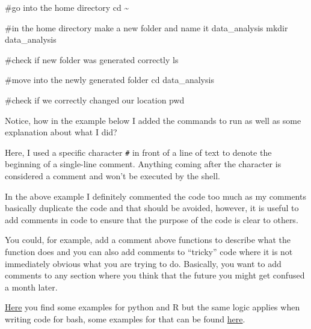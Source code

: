 \documentclass[
  letterpaper,
  DIV=11,
  numbers=noendperiod]{scrreprt}
\newenvironment{Shaded}{}{}
\newcommand{\BuiltInTok}[1]{\textcolor[rgb]{0.84,0.23,0.29}{#1}}
\newcommand{\CommentTok}[1]{\textcolor[rgb]{0.42,0.45,0.49}{#1}}
\newcommand{\FunctionTok}[1]{\textcolor[rgb]{0.44,0.26,0.76}{#1}}
\newcommand{\NormalTok}[1]{\textcolor[rgb]{0.14,0.16,0.18}{#1}}
\begin{document}
\begin{Shaded}
\begin{Highlighting}[]
\CommentTok{\#go into the home directory}
\BuiltInTok{cd}\NormalTok{ \textasciitilde{}}

\CommentTok{\#in the home directory make a new folder and name it data\_analysis}
\FunctionTok{mkdir}\NormalTok{ data\_analysis}

\CommentTok{\#check if new folder was generated correctly}
\FunctionTok{ls}

\CommentTok{\#move into the newly generated folder}
\BuiltInTok{cd}\NormalTok{ data\_analysis}

\CommentTok{\#check if we correctly changed our location}
\BuiltInTok{pwd}
\end{Highlighting}
\end{Shaded}

\begin{tcolorbox}[enhanced jigsaw, title=\textcolor{quarto-callout-tip-color}{\faLightbulb}\hspace{0.5em}{Tip: Commenting your code}, colframe=quarto-callout-tip-color-frame, opacitybacktitle=0.6, rightrule=.15mm, arc=.35mm, left=2mm, colbacktitle=quarto-callout-tip-color!10!white, bottomrule=.15mm, leftrule=.75mm, toprule=.15mm, opacityback=0, bottomtitle=1mm, colback=white, toptitle=1mm, breakable, titlerule=0mm, coltitle=black]

Notice, how in the example below I added the commands to run as well as
some explanation about what I did?

Here, I used a specific character \texttt{\#} in front of a line of text
to denote the beginning of a single-line comment. Anything coming after
the character is considered a comment and won't be executed by the
shell.

In the above example I definitely commented the code too much as my
comments basically duplicate the code and that should be avoided,
however, it is useful to add comments in code to ensure that the purpose
of the code is clear to others.

You could, for example, add a comment above functions to describe what
the function does and you can also add comments to ``tricky'' code where
it is not immediately obvious what you are trying to do. Basically, you
want to add comments to any section where you think that the future you
might get confused a month later.

\href{https://best-practice-and-impact.github.io/qa-of-code-guidance/code_documentation.html}{Here}
you find some examples for python and R but the same logic applies when
writing code for bash, some examples for that can be found
\href{https://linuxize.com/post/bash-comments/}{here}.

\end{tcolorbox}
\end{document}
